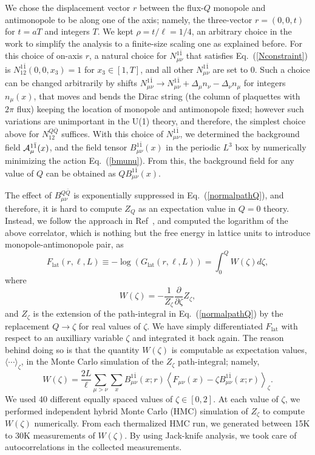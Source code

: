 \documentclass[prd, onecolumn, superscriptaddress, nofootinbib, notitlepage, floatfix]{revtex4-1}
\newcommand\beq{\begin{equation}}
\newcommand\eeq[1]{\label{#1}\end{equation}}
\newcommand\eqn[1]{Eq.\ (\ref{#1})}
\newcommand{\lat}{\mathrm{lat}}
\begin{document}
We chose the displacement vector $r$ between the flux-$Q$ monopole
and antimonopole to be along one of the axis; namely, the
three-vector $r=(0,0,t )$ for $t=aT$ and integers $T$.  We kept
$\rho = t/\ell=1/4$, an arbitrary choice in the work to simplify
the analysis to a finite-size scaling one as explained before.  For
this choice of on-axis $r$, a natural choice for $N_{\mu\nu}^{1\bar
1}$ that satisfies \eqn{Nconstraint} is $N_{12}^{1\bar 1}(0,0,x_3)
= 1$ for $x_3\in[1,T]$, and all other $N_{\mu\nu}^{1\bar 1}$ are
set to 0.  Such a choice can be changed arbitrarily by shifts
$N_{\mu\nu}^{1\bar 1} \to N_{\mu\nu}^{1\bar 1} + \Delta_\mu n_\nu
- \Delta_\nu n_\mu$ for integers $n_\mu(x)$, that moves and bends
the Dirac string (the column of plaquettes with $2\pi$ flux)
keeping the location of monopole and antimonopole fixed; however
such variations are unimportant in the U(1) theory, and therefore,
the simplest choice above for $N_{12}^{Q\bar Q}$ suffices. With this
choice of $N_{\mu\nu}^{1\bar 1}$, we determined the background field
${\cal A}^{1\bar 1}_\mu(x)$, and the field tensor $B^{1\bar
1}_{\mu\nu}(x)$ in the periodic $L^3$ box by numerically minimizing
the action \eqn{bmunu}. From this, the background field for any value
of $Q$ can be obtained as $Q B^{1\bar 1}_{\mu\nu}(x)$.

The effect of $B^{Q\bar Q}_{\mu\nu}$ is exponentially suppressed
in \eqn{normalpathQ}, and therefore, it is hard to compute $Z_Q$
as an expectation value in $Q=0$ theory.  Instead, we follow the
approach in Ref~\cite{Karthik:2018rcg}, and computed the logarithm
of the above correlator, which is nothing but the free energy in
lattice units to introduce monopole-antimonopole pair, as
\beq
F_\lat(r,\ell,L)\equiv -\log(G_\lat(r,\ell,L)) = \int_0^Q W(\zeta) d\zeta,
\eeq{barefreeenergy}
where 
\beq
W(\zeta) = -\frac{1}{Z_\zeta}\frac{\partial}{\partial\zeta}Z_{\zeta},
\eeq{wdef}
and $Z_\zeta$ is the extension of the path-integral in \eqn{normalpathQ}
by the replacement $Q\to \zeta$ for real values of $\zeta$.  We
have simply differentiated $F_\lat$ with respect to an auxilliary
variable $\zeta$ and integrated it back again. The reason behind
doing so is that the quantity $W(\zeta)$ is computable as expectation
values, $\langle\cdots\rangle_\zeta$, in the Monte Carlo simulation
of the $Z_\zeta$ path-integral; namely,
\beq
W(\zeta) = \frac{2L}{\ell}\sum_{\mu>\nu}\sum_{x} B_{\mu\nu}^{1\bar 1}(x;r) \left\langle F_{\mu\nu}(x) - \zeta B_{\mu\nu}^{1\bar 1}(x;r)\right\rangle_\zeta.
\eeq{wzetameas}
We used 40 different equally spaced values of $\zeta\in[0,2]$.  At
each value of $\zeta$, we performed independent hybrid Monte Carlo
(HMC) simulation of $Z_\zeta$ to compute $W(\zeta)$ numerically.
From each thermalized HMC run, we generated between 15K to 30K
measurements of $W(\zeta)$. By using Jack-knife analysis, we took
care of autocorrelations in the collected measurements.
\end{document}
